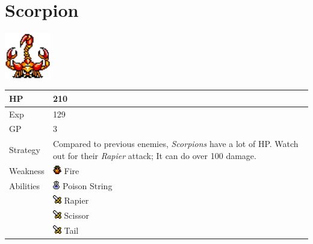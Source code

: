 \section{Scorpion}
\label{monster:scorpion}

\includegraphics[height=2cm,keepaspectratio]{./resources/monster/scorpion}

\begin{longtable}{ l p{9cm} }
	HP
	& 210
\\ \hline
	Exp
	& 129
\\ \hline
	GP
	& 3
\\ \hline
	Strategy
	& Compared to previous enemies, \textit{Scorpions} have a lot of HP. Watch out for their \textit{Rapier} attack; It can do over 100 damage.
\\ \hline
	Weakness
	& \includegraphics[height=1em,keepaspectratio]{./resources/effects/fire} Fire
\\ \hline
	Abilities
	& \includegraphics[height=1em,keepaspectratio]{./resources/effects/poison} Poison String \\
	& \includegraphics[height=1em,keepaspectratio]{./resources/effects/damage} Rapier \\
	& \includegraphics[height=1em,keepaspectratio]{./resources/effects/damage} Scissor \\
	& \includegraphics[height=1em,keepaspectratio]{./resources/effects/damage} Tail
\end{longtable}
